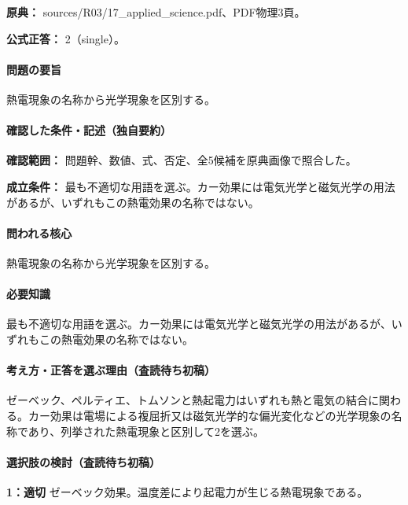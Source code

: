 \noindent\textbf{原典：} sources/R03/17\_applied\_science.pdf、PDF物理3頁。

\textbf{公式正答：} 2（single）。

\paragraph{問題の要旨} 熱電現象の名称から光学現象を区別する。

\paragraph{確認した条件・記述（独自要約）}\mbox{}\par

\noindent\textbf{確認範囲：} 問題幹、数値、式、否定、全5候補を原典画像で照合した。\par

\noindent\textbf{成立条件：} 最も不適切な用語を選ぶ。カー効果には電気光学と磁気光学の用法があるが、いずれもこの熱電効果の名称ではない。\par

\paragraph{問われる核心} 熱電現象の名称から光学現象を区別する。

\paragraph{必要知識} 最も不適切な用語を選ぶ。カー効果には電気光学と磁気光学の用法があるが、いずれもこの熱電効果の名称ではない。

\paragraph{考え方・正答を選ぶ理由（査読待ち初稿）} ゼーベック、ペルティエ、トムソンと熱起電力はいずれも熱と電気の結合に関わる。カー効果は電場による複屈折又は磁気光学的な偏光変化などの光学現象の名称であり、列挙された熱電現象と区別して2を選ぶ。

\paragraph{選択肢の検討（査読待ち初稿）}\mbox{}\par

\noindent\textbf{1：適切} ゼーベック効果。温度差により起電力が生じる熱電現象である。\par

